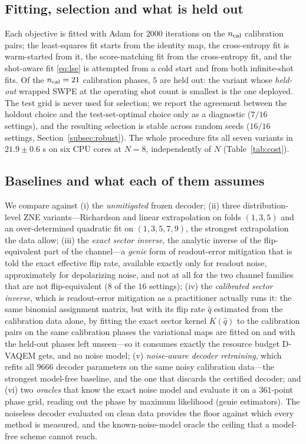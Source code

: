 \documentclass[ASNA,twocolumn]{USG}
\newcommand{\dvaqem}{D-VAQEM}
\begin{document}
\subsection{Fitting, selection and what is held out}
\label{subsec:selection}

Each objective is fitted with Adam for $2000$ iterations on the $n_{\rm cal}$
calibration pairs; the least-squares fit starts from the identity map, the
cross-entropy fit is warm-started from it, the score-matching fit from the
cross-entropy fit, and the shot-aware fit \eqref{eq:lse} is attempted from a cold
start and from both infinite-shot fits.  Of the $n_{\rm cal}=21$ calibration
phases, $5$
are held out: the variant whose \emph{held-out} wrapped SWPE at the operating
shot count is smallest is the one deployed.  The test grid is never used for
selection; we report the agreement between the holdout choice and the
test-set-optimal choice only as a diagnostic ($7/16$ settings), and the
resulting selection is stable across random seeds ($16/16$ settings,
Section~\ref{subsec:robust}).  The whole procedure fits all seven variants in
$21.9\pm0.6$ s on six CPU cores at $N=8$, independently of $N$
(Table~\ref{tab:cost}).

\subsection{Baselines and what each of them assumes}
\label{subsec:baselines}

We compare against (i) the \emph{unmitigated} frozen decoder; (ii) three
distribution-level ZNE variants---Richardson and linear extrapolation on folds
$(1,3,5)$ and an over-determined quadratic fit on $(1,3,5,7,9)$, the strongest
extrapolation the data allow; (iii) the \emph{exact sector inverse}, the
analytic inverse of the flip-equivalent part of the channel---a \emph{genie}
form of readout-error mitigation that is told the exact effective flip rate,
available exactly only for readout noise, approximately for depolarizing noise,
and not at all for the two channel families that are not flip-equivalent
($8$ of the $16$ settings); (iv) the \emph{calibrated sector inverse}, which is
readout-error mitigation as a practitioner actually runs it: the same binomial
assignment matrix, but with its flip rate $\hat q$ estimated from the
calibration data alone, by fitting the exact sector kernel $K(\hat q)$ to the
calibration pairs on the same calibration phases the variational maps are
fitted on and with the held-out phases left unseen---so it consumes exactly the
resource budget \dvaqem{} gets, and no noise model; (v)
\emph{noise-aware decoder retraining}, which refits all $9666$ decoder
parameters on the same noisy calibration data---the strongest model-free
baseline, and the one that discards the certified decoder; and (vi) two
\emph{oracles} that know the exact noise model and evaluate it on a
$361$-point phase grid, reading out the phase by maximum likelihood (genie
estimators).  The noiseless decoder evaluated on clean data provides the floor
against which every method is measured, and the known-noise-model oracle the
ceiling that a model-free scheme cannot reach.
\end{document}
